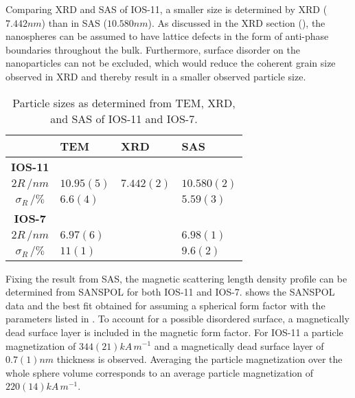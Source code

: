 \documentclass[\main/dresen_thesis.tex]{subfiles}
\begin{document}

    Comparing XRD and SAS of IOS-11, a smaller size is determined by XRD ($7.442 \unit{nm}$) than in SAS ($10.580 \unit{nm}$).
    As discussed in the XRD section (), the nanospheres can be assumed to have lattice defects in the form of anti-phase boundaries throughout the bulk.
    Furthermore, surface disorder on the nanoparticles can not be excluded, which would reduce the coherent grain size observed in XRD and thereby result in a smaller observed particle size.

    \begin{table}[!htbp]
      \centering
      \caption{\label{tab:looselyPackedNP:nanoparticle:comparisonSASXRDTEM}Particle sizes as determined from TEM, XRD, and SAS of IOS-11 and IOS-7.}
      \begin{tabular}{ c | l | l | l }
        \rule{0pt}{2ex}                                             & \textbf{TEM}  & \textbf{XRD}& \textbf{SAS} \\
        \hline
        \rule{0pt}{2ex} \textbf{IOS-11}\\
        \hline
        \rule{0pt}{2ex} $2R \, / \unit{nm}$                         & $10.95(5)$    & $7.442(2)$  & $10.580(2)$   \\
        \rule{0pt}{2ex} $\sigma_{R}  \, / \unit{\%}$                & $6.6(4)$      &             & $5.59(3)$\\
        \hline
        \rule{0pt}{2ex} \textbf{IOS-7}\\
        \hline
        \rule{0pt}{2ex} $2R \, / \unit{nm}$                         & $6.97(6)$     &             & $6.98(1)$\\
        \rule{0pt}{2ex} $\sigma_{R}  \, / \unit{\%}$                & $11(1)$       &             & $9.6(2)$\\
        \hline
      \end{tabular}
    \end{table}

    Fixing the result from SAS, the magnetic scattering length density profile can be determined from SANSPOL for both IOS-11 and IOS-7.
     shows the SANSPOL data and the best fit obtained for assuming a spherical form factor with the parameters listed in .
    To account for a possible disordered surface, a magnetically dead surface layer is included in the magnetic form factor.
    For IOS-11 a particle magnetization of $344(21) \unit{kA \, m^{-1}}$ and a magnetically dead surface layer of $0.7(1) \unit{nm}$ thickness is observed.
    Averaging the particle magnetization over the whole sphere volume corresponds to an average particle magnetization of $220(14) \unit{kA \, m^{-1}}$.
\end{document}
